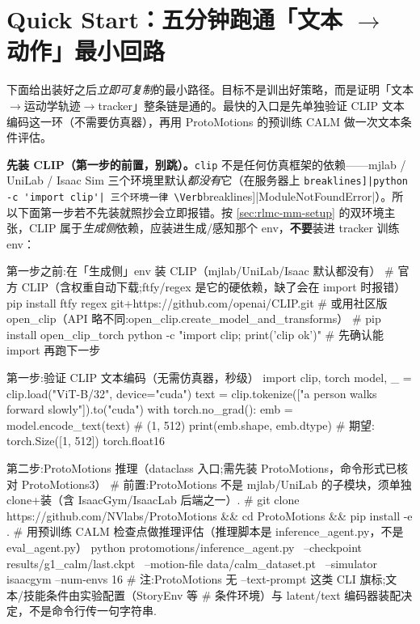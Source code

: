 \section*{\texorpdfstring{Quick Start：五分钟跑通「文本 $\to$ 动作」最小回路}{Quick Start：五分钟跑通文本到动作最小回路}}
\label{sec:rlmc-mm-quickstart}

下面给出装好之后\emph{立即可复制}的最小路径。目标不是训出好策略，而是证明「文本$\to$运动学轨迹$\to$tracker」整条链是通的。最快的入口是先单独验证 CLIP 文本编码这一环（不需要仿真器），再用 ProtoMotions 的预训练 CALM 做一次文本条件评估。

\textbf{先装 CLIP（第一步的前置，别跳）。}\verb|clip| 不是任何仿真框架的依赖——mjlab / UniLab / Isaac Sim 三个环境里默认\emph{都没有}它（在服务器上 \Verb[breaklines]|python -c 'import clip'| 三个环境一律 \Verb[breaklines]|ModuleNotFoundError|）。所以下面第一步若不先装就照抄会立即报错。按 \cref{sec:rlmc-mm-setup} 的双环境主张，CLIP 属于\emph{生成侧}依赖，应装进生成/感知那个 env，\textbf{不要}装进 tracker 训练 env：

\begin{codebox}[bash]{第一步之前:在「生成侧」env 装 CLIP（mjlab/UniLab/Isaac 默认都没有）}
# 官方 CLIP（含权重自动下载;ftfy/regex 是它的硬依赖，缺了会在 import 时报错）
pip install ftfy regex git+https://github.com/openai/CLIP.git
# 或用社区版 open_clip（API 略不同:open_clip.create_model_and_transforms）
# pip install open_clip_torch
python -c "import clip; print('clip ok')"        # 先确认能 import 再跑下一步
\end{codebox}

\begin{codebox}[Python]{第一步:验证 CLIP 文本编码（无需仿真器，秒级）}
import clip, torch
model, _ = clip.load("ViT-B/32", device="cuda")
text = clip.tokenize(["a person walks forward slowly"]).to("cuda")
with torch.no_grad():
    emb = model.encode_text(text)        # (1, 512)
print(emb.shape, emb.dtype)              # 期望: torch.Size([1, 512]) torch.float16
\end{codebox}

\begin{codebox}[bash]{第二步:ProtoMotions 推理（dataclass 入口;需先装 ProtoMotions，命令形式已核对 ProtoMotions3）}
# 前置:ProtoMotions 不是 mjlab/UniLab 的子模块，须单独 clone+装（含 IsaacGym/IsaacLab 后端之一）.
#   git clone https://github.com/NVlabs/ProtoMotions && cd ProtoMotions && pip install -e .
# 用预训练 CALM 检查点做推理评估（推理脚本是 inference_agent.py，不是 eval_agent.py）
python protomotions/inference_agent.py \
    --checkpoint results/g1_calm/last.ckpt \
    --motion-file data/calm_dataset.pt \
    --simulator isaacgym --num-envs 16
# 注:ProtoMotions 无 --text-prompt 这类 CLI 旗标;文本/技能条件由实验配置（StoryEnv 等
#     条件环境）与 latent/text 编码器装配决定，不是命令行传一句字符串.
\end{codebox}


